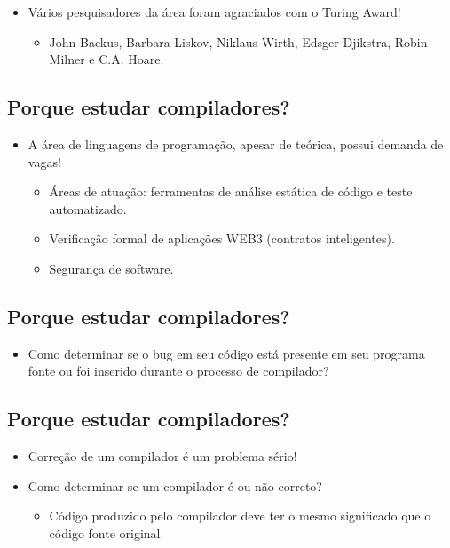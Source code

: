 \documentclass[11pt]{article}
\begin{document}
\begin{itemize}
\item Vários pesquisadores da área foram agraciados com o Turing Award!
\begin{itemize}
\item John Backus, Barbara Liskov, Niklaus Wirth, Edsger Djikstra, Robin Milner e C.A. Hoare.
\end{itemize}
\end{itemize}
\subsection*{Porque estudar compiladores?}
\label{sec:orgb9c35c2}

\begin{itemize}
\item A área de linguagens de programação, apesar de teórica, possui demanda de vagas!
\begin{itemize}
\item Áreas de atuação: ferramentas de análise estática de código e teste automatizado.
\item Verificação formal de aplicações WEB3 (contratos inteligentes).
\item Segurança de software.
\end{itemize}
\end{itemize}
\subsection*{Porque estudar compiladores?}
\label{sec:org4ccf3cf}

\begin{itemize}
\item Como determinar se o bug em seu código está presente em seu programa fonte ou foi inserido durante o processo de compilador?
\end{itemize}
\subsection*{Porque estudar compiladores?}
\label{sec:org7b1d275}

\begin{itemize}
\item Correção de um compilador é um problema sério!

\item Como determinar se um compilador é ou não correto?
\begin{itemize}
\item Código produzido pelo compilador deve ter o mesmo significado que o código fonte original.
\end{itemize}
\end{itemize}
\end{document}
